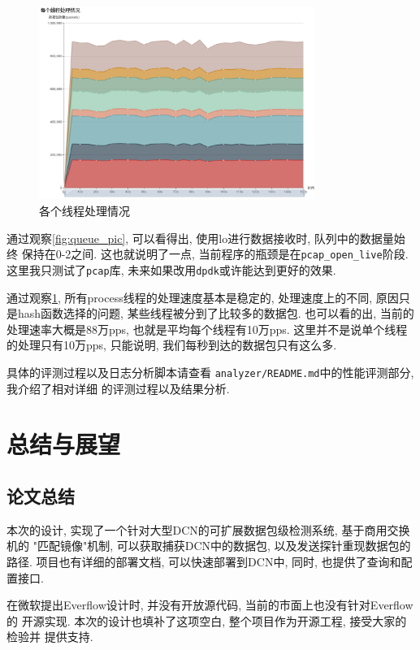 \begin{figure}[htbp!]
  \centering
  \includegraphics[width=0.8\textwidth]{../img/每个线程处理情况-new.png}
  \caption{各个线程处理情况}
  \label{fig:process_pic}
\end{figure}


通过观察\ref{fig:queue_pic}, 可以看得出, 使用lo进行数据接收时, 队列中的数据量始终
保持在0-2之间. 这也就说明了一点, 当前程序的瓶颈是在\texttt{pcap\_open\_live}阶段.
这里我只测试了\texttt{pcap}库, 未来如果改用\texttt{dpdk}或许能达到更好的效果.

通过观察\ref{fig:process_pic}, 所有process线程的处理速度基本是稳定的,
处理速度上的不同, 原因只是hash函数选择的问题, 某些线程被分到了比较多的数据包.
也可以看的出, 当前的处理速率大概是88万pps, 也就是平均每个线程有10万pps.
这里并不是说单个线程的处理只有10万pps, 只能说明, 我们每秒到达的数据包只有这么多.

具体的评测过程以及日志分析脚本请查看
\texttt{analyzer/README.md}\cite{Niftyflow}中的性能评测部分,我介绍了相对详细
的评测过程以及结果分析.

\chapter{总结与展望}

\section{论文总结}

  本次的设计, 实现了一个针对大型DCN的可扩展数据包级检测系统, 基于商用交换机的
"匹配镜像"机制, 可以获取捕获DCN中的数据包, 以及发送探针重现数据包的路径.
项目也有详细的部署文档, 可以快速部署到DCN中, 同时, 也提供了查询和配置接口.

  在微软提出Everflow设计时, 并没有开放源代码, 当前的市面上也没有针对Everflow的
开源实现. 本次的设计也填补了这项空白, 整个项目作为开源工程, 接受大家的检验并
提供支持.

